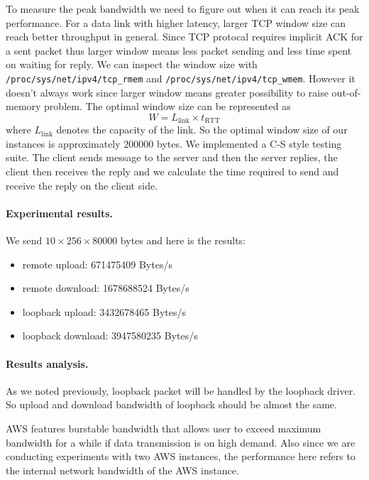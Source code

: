 To measure the peak bandwidth we need to figure out when it can reach its peak performance. For a data link with higher latency, larger TCP window size can reach better throughput in general. Since TCP protocal requires implicit ACK for a sent packet thus larger window means less packet sending and less time spent on waiting for reply. We can inspect the window size with \texttt{/proc/sys/net/ipv4/tcp\_rmem} and \texttt{/proc/sys/net/ipv4/tcp\_wmem}. However it doesn't always work since larger window means greater possibility to raise out-of-memory problem. The optimal window size can be represented as
\begin{equation}
W=L_{\text{link}} \times t_{\text{RTT}}
\end{equation}
where $L_{\text{link}}$ denotes the capacity of the link. So the optimal window size of our instances is approximately $200000$ bytes. We implemented a C-S style testing suite. The client sends message to the server and then the server replies, the client then receives the reply and we calculate the time required to send and receive the reply on the client side.

\paragraph{Experimental results.}
We send $10 \times 256 \times 80000$ bytes and here is the results:
\begin{itemize}[leftmargin=*]
	\item remote upload:    671475409 Bytes/s
	\item remote download: 1678688524 Bytes/s
\end{itemize}
\begin{itemize}[leftmargin=*]
	\item loopback upload:   3432678465 Bytes/s
	\item loopback download: 3947580235 Bytes/s
\end{itemize}
\paragraph{Results analysis.} As we noted previously, loopback packet will be handled by the loopback driver. So upload and download bandwidth of loopback should be almost the same. 

AWS features burstable bandwidth that allows user to exceed maximum bandwidth for a while if data transmission is on high demand. Also since we are conducting experiments with two AWS instances, the performance here refers to the internal network bandwidth of the AWS instance.

